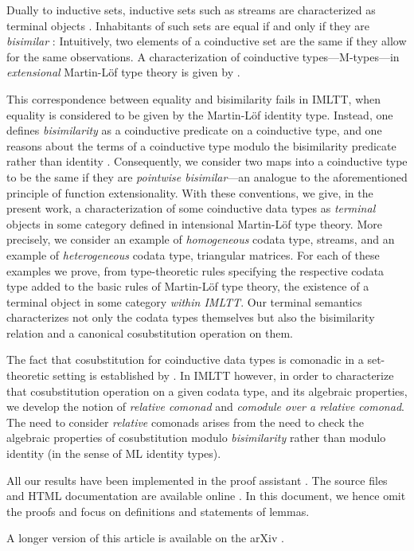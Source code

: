 \documentclass[envcountsame]{llncs}
\begin{document}
 Dually to inductive sets, inductive sets such as streams are characterized as terminal objects \parencite{jacobs1997tutorial}.
 Inhabitants of such sets are equal if and only if they are \emph{bisimilar} \parencite{DBLP:journals/mscs/TuriR98}:
 Intuitively, two elements of a coinductive set are the same if they allow for the same observations.
 A characterization of coinductive types---\textsf{M}-types---in \emph{extensional} Martin-L\"of type theory
 is given by \parencite{DBLP:conf/calco/Marchi05}.
 
 This correspondence between equality and bisimilarity fails in IMLTT, when equality is considered to be given by the 
 Martin-L\"of identity type. Instead, one defines \emph{bisimilarity} as a coinductive predicate 
 on a coinductive type, and one reasons about the terms of a coinductive type modulo the bisimilarity predicate
 rather than identity \parencite{DBLP:conf/types/Coquand93}.
 Consequently, we consider two maps into a coinductive type to be the same if they are \emph{pointwise bisimilar}---an analogue
 to the aforementioned principle of function extensionality. 
 With these conventions, we give, in the present work, a characterization of some coinductive data types as \emph{terminal} objects in some category 
 defined in intensional Martin-L\"of type theory.
 More precisely, we consider an example of \emph{homogeneous} codata type, streams, and 
 an example of \emph{heterogeneous} codata type, triangular matrices.
 For each of these examples we prove, 
 from type-theoretic rules specifying the respective codata type added to the basic rules of Martin-L\"of type theory,
 the existence of a terminal object in some category \emph{within IMLTT}.
 Our terminal semantics characterizes not only the codata types themselves but also the bisimilarity relation and
 a canonical cosubstitution operation on them.
 
 The fact that cosubstitution for coinductive data types is comonadic in a set-theoretic setting is established by \textcite{DBLP:conf/sfp/UustaluV01}.
 In IMLTT however, in order to characterize that cosubstitution operation on a given codata type, and its algebraic properties,
 we develop the notion of \emph{relative comonad} and \emph{comodule over a relative comonad}.
 The need to consider \emph{relative} comonads arises from the  need to check the algebraic properties of cosubstitution modulo \emph{bisimilarity} rather
 than modulo identity (in the sense of ML identity types).
 
 
 All our results have been implemented in the proof assistant \coq \parencite{coq84pl3}.
 The \coq source files and HTML documentation are available online \parencite{trimat_coq}.
 In this document, we hence omit the proofs and focus on definitions and statements of lemmas.
\begin{Short}
 A longer version of this article is available on the arXiv \parencite{trimat_coq}.
\end{Short}
\end{document}
